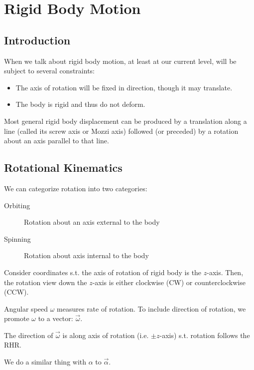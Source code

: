 \chapter{Rigid Body Motion}

\section{Introduction}

When we talk about rigid body motion, at least at our current level, will be subject to several constraints:

\begin{itemize}
	\item The axis of rotation will be fixed in direction, though it may translate.
	\item The body is rigid and thus do not deform.
\end{itemize}

\begin{theorem}
	Most general rigid body displacement can be produced by a translation along a line (called its screw axis or Mozzi axis) followed (or preceded) by a rotation about an axis parallel to that line.
\end{theorem}

\section{Rotational Kinematics}


We can categorize rotation into two categories:

\begin{description}
	\item[Orbiting] Rotation about an axis external to the body
	\item[Spinning] Rotation about axis internal to the body
\end{description}

Consider coordinates s.t. the axis of rotation of rigid body is the $z$-axis. Then, the rotation view down the $z$-axis is either clockwise (CW) or counterclockwise (CCW).

Angular speed $\omega$ measures rate of rotation. To include direction of rotation, we promote $\omega$ to a vector: $\vec\omega$.

The direction of $\vec\omega$ is along axis of rotation (i.e. $\pm z$-axis) s.t. rotation follows the RHR.

We do a similar thing with $\alpha$ to $\vec\alpha$.

